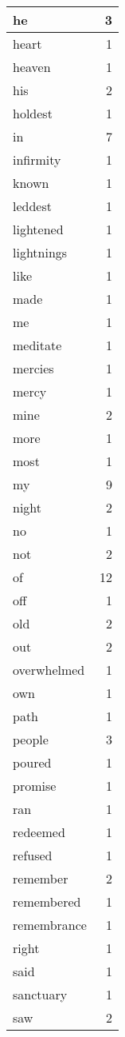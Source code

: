 \begin{center}
\begin{longtable}{l|r}
he & 3\\ \hline 
heart & 1\\ \hline 
heaven & 1\\ \hline 
his & 2\\ \hline 
holdest & 1\\ \hline 
in & 7\\ \hline 
infirmity & 1\\ \hline 
known & 1\\ \hline 
leddest & 1\\ \hline 
lightened & 1\\ \hline 
lightnings & 1\\ \hline 
like & 1\\ \hline 
made & 1\\ \hline 
me & 1\\ \hline 
meditate & 1\\ \hline 
mercies & 1\\ \hline 
mercy & 1\\ \hline 
mine & 2\\ \hline 
more & 1\\ \hline 
most & 1\\ \hline 
my & 9\\ \hline 
night & 2\\ \hline 
no & 1\\ \hline 
not & 2\\ \hline 
of & 12\\ \hline 
off & 1\\ \hline 
old & 2\\ \hline 
out & 2\\ \hline 
overwhelmed & 1\\ \hline 
own & 1\\ \hline 
path & 1\\ \hline 
people & 3\\ \hline 
poured & 1\\ \hline 
promise & 1\\ \hline 
ran & 1\\ \hline 
redeemed & 1\\ \hline 
refused & 1\\ \hline 
remember & 2\\ \hline 
remembered & 1\\ \hline 
remembrance & 1\\ \hline 
right & 1\\ \hline 
said & 1\\ \hline 
sanctuary & 1\\ \hline 
saw & 2\\ \hline 

\end{longtable}
\end{center}
